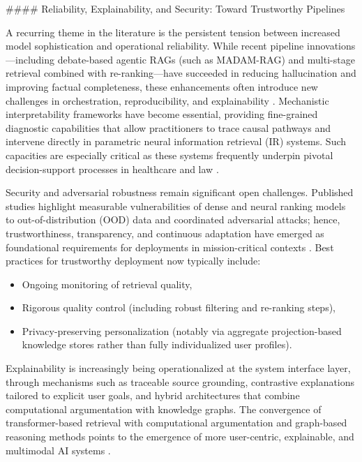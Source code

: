 \documentclass[11pt]{article}
\begin{document}
#### Reliability, Explainability, and Security: Toward Trustworthy Pipelines

A recurring theme in the literature is the persistent tension between increased model sophistication and operational reliability. While recent pipeline innovations—including debate-based agentic RAGs (such as MADAM-RAG) and multi-stage retrieval combined with re-ranking—have succeeded in reducing hallucination and improving factual completeness, these enhancements often introduce new challenges in orchestration, reproducibility, and explainability \cite{ref2,ref3,ref5,ref21,ref28,ref39,ref46,ref50,ref55,ref61}. Mechanistic interpretability frameworks have become essential, providing fine-grained diagnostic capabilities that allow practitioners to trace causal pathways and intervene directly in parametric neural information retrieval (IR) systems. Such capacities are especially critical as these systems frequently underpin pivotal decision-support processes in healthcare and law \cite{ref33,ref34,ref53}.

Security and adversarial robustness remain significant open challenges. Published studies highlight measurable vulnerabilities of dense and neural ranking models to out-of-distribution (OOD) data and coordinated adversarial attacks; hence, trustworthiness, transparency, and continuous adaptation have emerged as foundational requirements for deployments in mission-critical contexts \cite{ref2,ref7,ref37,ref49,ref51,ref55,ref61,ref62}. Best practices for trustworthy deployment now typically include:
\begin{itemize}
  \item Ongoing monitoring of retrieval quality,
  \item Rigorous quality control (including robust filtering and re-ranking steps),
  \item Privacy-preserving personalization (notably via aggregate projection-based knowledge stores rather than fully individualized user profiles).
\end{itemize}
\cite{ref21,ref23,ref30,ref48}

Explainability is increasingly being operationalized at the system interface layer, through mechanisms such as traceable source grounding, contrastive explanations tailored to explicit user goals, and hybrid architectures that combine computational argumentation with knowledge graphs. The convergence of transformer-based retrieval with computational argumentation and graph-based reasoning methods points to the emergence of more user-centric, explainable, and multimodal AI systems \cite{ref17,ref24,ref29,ref36,ref37,ref39,ref40,ref43,ref54}.
\end{document}
